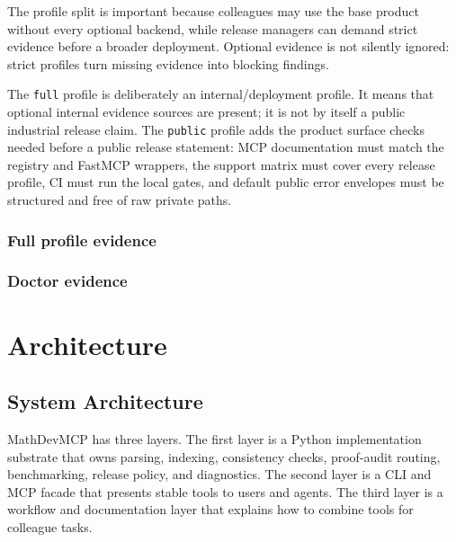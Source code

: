 \documentclass[12pt,a4paper,openany]{book}
\begin{document}
The profile split is important because colleagues may use the base product
without every optional backend, while release managers can demand strict
evidence before a broader deployment. Optional evidence is not silently ignored:
strict profiles turn missing evidence into blocking findings.

The \texttt{full} profile is deliberately an internal/deployment profile. It
means that optional internal evidence sources are present; it is not by itself a
public industrial release claim. The \texttt{public} profile adds the product
surface checks needed before a public release statement: MCP documentation must
match the registry and FastMCP wrappers, the support matrix must cover every
release profile, CI must run the local gates, and default public error
envelopes must be structured and free of raw private paths.

\section{Full profile evidence}



\section{Doctor evidence}



\part{Architecture}

\chapter{System Architecture}

MathDevMCP has three layers. The first layer is a Python implementation
substrate that owns parsing, indexing, consistency checks, proof-audit routing,
benchmarking, release policy, and diagnostics. The second layer is a CLI and MCP
facade that presents stable tools to users and agents. The third layer is a
workflow and documentation layer that explains how to combine tools for
colleague tasks.
\end{document}
